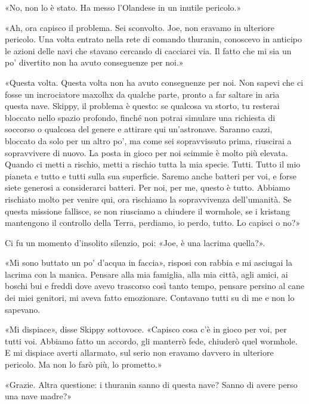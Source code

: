 «No, non lo è stato. Ha messo l'Olandese in un inutile pericolo.»

«Ah, ora capisco il problema. Sei sconvolto. Joe, non eravamo in
ulteriore pericolo. Una volta entrato nella rete di comando thuranin,
conoscevo in anticipo le azioni delle navi che stavano cercando di
cacciarci via. Il fatto che mi sia un po' divertito non ha avuto
conseguenze per noi.»

«Questa volta. Questa volta non ha avuto conseguenze per noi. Non sapevi
che ci fosse un incrociatore maxolhx da qualche parte, pronto a far
saltare in aria questa nave. Skippy, il problema è questo: se qualcosa
va storto, tu resterai bloccato nello spazio profondo, finché non potrai
simulare una richiesta di soccorso o qualcosa del genere e attirare qui
un'astronave. Saranno cazzi, bloccato da solo per un altro po', ma come
sei sopravvissuto prima, riuscirai a sopravvivere di nuovo. La posta in
gioco per noi scimmie è molto più elevata. Quando ci metti a rischio,
metti a rischio tutta la mia specie. Tutti. Tutto il mio pianeta e tutto
e tutti sulla sua superficie. Saremo anche batteri per voi, e forse
siete generosi a considerarci batteri. Per noi, per me, questo è tutto.
Abbiamo rischiato molto per venire qui, ora rischiamo la sopravvivenza
dell'umanità. Se questa missione fallisce, se non riusciamo a chiudere
il wormhole, se i kristang mantengono il controllo della Terra,
perdiamo, io perdo, tutto. Lo capisci o no?»

Ci fu un momento d'insolito silenzio, poi: «Joe, è una lacrima quella?».

«Mi sono buttato un po' d'acqua in faccia», risposi con rabbia e mi
asciugai la lacrima con la manica. Pensare alla mia famiglia, alla mia
città, agli amici, ai boschi bui e freddi dove avevo trascorso così
tanto tempo, pensare persino al cane dei miei genitori, mi aveva fatto
emozionare. Contavano tutti su di me e non lo sapevano.

«Mi dispiace», disse Skippy sottovoce. «Capisco cosa c'è in gioco per
voi, per tutti voi. Abbiamo fatto un accordo, gli manterrò fede,
chiuderò quel wormhole. E mi dispiace averti allarmato, sul serio non
eravamo davvero in ulteriore pericolo. Ma non lo farò più, lo prometto.»

«Grazie. Altra questione: i thuranin sanno di questa nave? Sanno di
avere perso una nave madre?»

